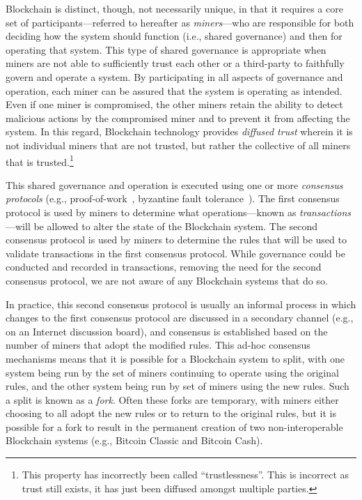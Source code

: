 Blockchain is distinct, though, not necessarily unique, in that it requires a core set of participants---referred to hereafter as \emph{miners}---who are responsible for both deciding how the system should function (i.e., shared governance) and then for operating that system.
This type of shared governance is appropriate when miners are not able to sufficiently trust each other or a third-party to faithfully govern and operate a system.
By participating in all aspects of governance and operation, each miner can be assured that the system is operating as intended.
Even if one miner is compromised, the other miners retain the ability to detect malicious actions by the compromised miner and to prevent it from affecting the system.
In this regard, Blockchain technology provides \emph{diffused trust} wherein it is not individual miners that are not trusted, but rather the collective of all miners that is trusted.\footnote{This property has incorrectly been called ``trustlessness''. This is incorrect as trust still exists, it has just been diffused amongst multiple parties.} 

This shared governance and operation is executed using one or more \emph{consensus protocols} (e.g., proof-of-work~\cite{DN93,back1997partial,NakamotoS8}, byzantine fault tolerance~\cite{castro1999practical}).
The first consensus protocol is used by miners to determine what operations---known as \emph{transactions}---will be allowed to alter the state of the Blockchain system.
The second consensus protocol is used by miners to determine the rules that will be used to validate transactions in the first consensus protocol.
While governance could be conducted and recorded in transactions, removing the need for the second consensus protocol, we are not aware of any Blockchain systems that do so.

In practice, this second consensus protocol is usually an informal process in which changes to the first consensus protocol are discussed in a secondary channel (e.g., on an Internet discussion board), and consensus is established based on the number of miners that adopt the modified rules.
This ad-hoc consensus mechanisms means that it is possible for a Blockchain system to split, with one system being run by the set of miners continuing to operate using the original rules, and the other system being run by set of miners using the new rules.
Such a split is known as a \emph{fork}.
Often these forks are temporary, with miners either choosing to all adopt the new rules or to return to the original rules, but it is possible for a fork to result in the permanent creation of two non-interoperable Blockchain systems (e.g., Bitcoin Classic and Bitcoin Cash).

